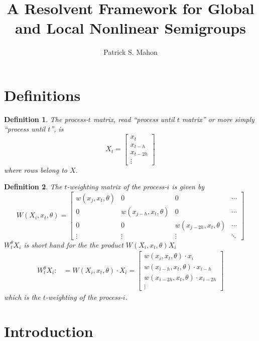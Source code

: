 \documentclass{article}
\newtheorem{definition}{Definition}
\begin{document}
\title{A Resolvent Framework for Global and Local Nonlinear Semigroups}
\author{Patrick S. Mahon}
\maketitle

\tableofcontents
\printunsrtglossary[type=symbols,style=long]

\section{Definitions}
\begin{definition}
The process-$t$ matrix, read  ``process until $t$ matrix'' or more simply ``process until $t$'', is 
$$ X_t = 
\begin{bmatrix}
    x_t \\ 
    x_{t-h} \\ 
    x_{t-2h} \\
    \vdots
\end{bmatrix}
$$
where rows belong to $X$.
\end{definition}

\begin{definition}
The $t$-weighting matrix of the process-$i$ is given by $$W(X_i, x_t, \theta) =
\begin{bmatrix}
    w(x_j, x_t, \theta) & 0 & 0 &\cdots \\
    0 & w(x_{j-h}, x_t, \theta) & 0 &  \cdots\\
    0 & 0 & w(x_{j-2h}, x_t, \theta) & \cdots\\
    \vdots & \vdots & \vdots & \ddots
\end{bmatrix}$$\medskip
$W_t^\theta X_{i}$ is short hand for the the product $W(X_i, x_t, \theta) X_i$ 
\begin{align*}
    W_t^\theta X_{i} :&= W(X_i, x_t, \theta) \cdot X_i = 
    \begin{bmatrix}
        w(x_i, x_t, \theta) \cdot x_i \\
        w(x_{i-h}, x_t, \theta) \cdot x_{i-h} \\
        w(x_{i-2h}, x_t, \theta) \cdot x_{i-2h} \\
        \vdots
\end{bmatrix}
\end{align*}
which is the $t$-weighting of the process-$i$.
\end{definition}

\section{Introduction}
\end{document}
